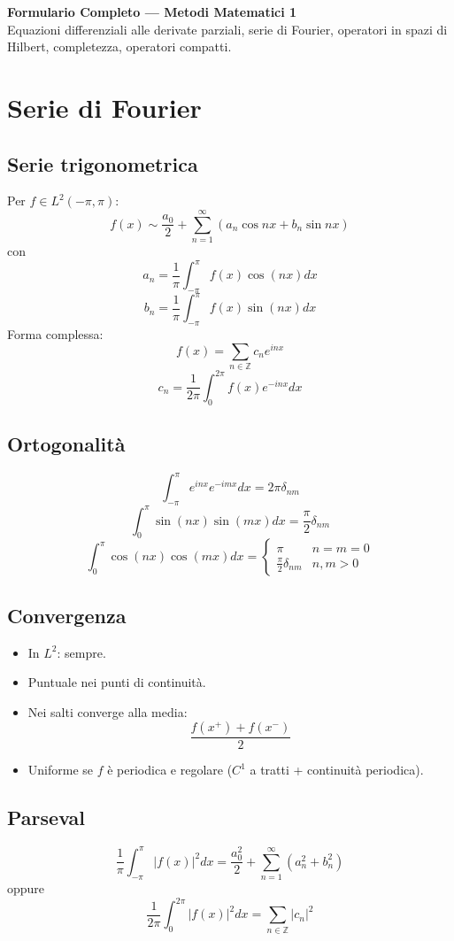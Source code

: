 \documentclass[a4paper,10pt]{article}
\begin{document}
\begin{center}
{\LARGE \textbf{Formulario Completo — Metodi Matematici 1}}\\
\vspace{2mm}
Equazioni differenziali alle derivate parziali, serie di Fourier, operatori in spazi di Hilbert, completezza, operatori compatti.
\end{center}
\tableofcontents
\vspace{4mm}
\section{Serie di Fourier}
\subsection{Serie trigonometrica}
Per $f \in L^2(-\pi,\pi)$:
\[f(x) \sim \frac{a_0}{2}+\sum_{n=1}^{\infty}(a_n\cos nx+b_n\sin nx)\]
con
\[a_n=\frac{1}{\pi}\int_{-\pi}^{\pi}f(x)\cos(nx)dx\]
\[b_n=\frac{1}{\pi}\int_{-\pi}^{\pi}f(x)\sin(nx)dx\]
Forma complessa:
\[f(x)=\sum_{n\in\mathbb Z} c_n e^{inx}\]
\[c_n=\frac{1}{2\pi}\int_{0}^{2\pi}f(x)e^{-inx}dx\]
\subsection{Ortogonalità}
\[\int_{-\pi}^{\pi}e^{inx}e^{-imx}dx=2\pi\delta_{nm}\]
\[\int_0^{\pi}\sin(nx)\sin(mx)dx=\frac{\pi}{2}\delta_{nm}\]
\[\int_0^{\pi}\cos(nx)\cos(mx)dx=
\begin{cases}
\pi & n=m=0
\\
\frac{\pi}{2}\delta_{nm} & n,m>0
\end{cases}\]
\subsection{Convergenza}
\begin{itemize}
\item In $L^2$: sempre.
\item Puntuale nei punti di continuità.
\item Nei salti converge alla media:
\[\frac{f(x^+)+f(x^-)}{2}\]
\item Uniforme se $f$ è periodica e regolare ($C^1$ a tratti + continuità periodica).
\end{itemize}
\subsection{Parseval}
\[\frac{1}{\pi}\int_{-\pi}^{\pi}|f(x)|^2dx
=
\frac{a_0^2}{2}+\sum_{n=1}^{\infty}(a_n^2+b_n^2)\]
oppure
\[\frac{1}{2\pi}\int_{0}^{2\pi}|f(x)|^2dx
=
\sum_{n\in\mathbb Z}|c_n|^2\]
\end{document}

